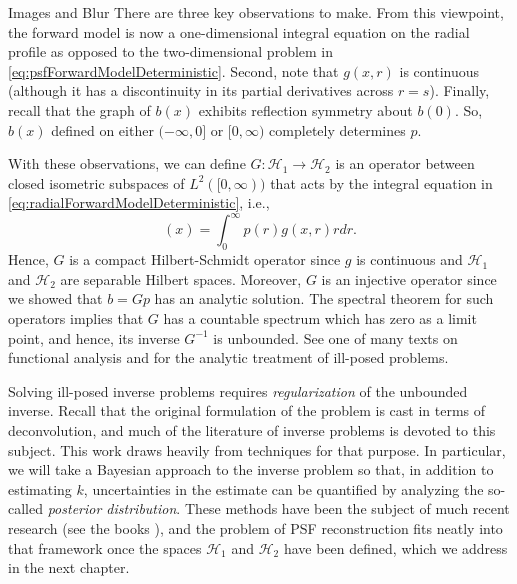 \begin{chapter}{Images and Blur}
  There are three key observations to make.
  From this viewpoint, the forward model is now a one-dimensional integral equation on the radial profile as opposed to the two-dimensional problem in \eqref{eq:psfForwardModelDeterministic}.
  Second, note that $g(x,r)$ is continuous (although it has a discontinuity in its partial derivatives across $r=s$).
  Finally, recall that the graph of $b(x)$ exhibits reflection symmetry about $b(0)$.
  So, $b(x)$ defined on either $(-\infty,0]$ or $[0,\infty)$ completely determines $p$.

  With these observations, we can define $G: \mathcal H_1 \to \mathcal H_2$ is an operator between closed isometric subspaces of $L^2([0,\infty))$ that acts by the integral equation in \eqref{eq:radialForwardModelDeterministic}, i.e., 
  \begin{equation}
    [\G p](x) = \int_0^\infty p(r) g(x,r) r dr.
  \end{equation}
  Hence, $G$ is a compact Hilbert-Schmidt operator since $g$ is continuous and $\mathcal H_1$ and $\mathcal H_2$ are separable Hilbert spaces.
  Moreover, $G$ is an injective operator since we showed that $b = Gp$ has an analytic solution. 
  The spectral theorem for such operators implies that $G$ has a countable spectrum which has zero as a limit point, and hence, its inverse $G^{-1}$ is unbounded. %
  See one of many texts on functional analysis \citep{bachman1966,rudin1991} and \citep{tikhonov1963,vogel2002,morozov1993} for the analytic treatment of ill-posed problems.

  Solving ill-posed inverse problems requires \emph{regularization} of the unbounded inverse.
  Recall that the original formulation of the problem is cast in terms of deconvolution, and much of the literature of inverse problems is devoted to this subject.
  This work draws heavily from techniques for that purpose. 
  In particular, we will take a Bayesian approach to the inverse problem so that, in addition to estimating $k$, uncertainties in the estimate can be quantified by analyzing the so-called \emph{posterior distribution}.
  These methods have been the subject of much recent research (see the books \citep{calvetti2007introduction,kaipo2005,stuart2010}), and the problem of PSF reconstruction fits neatly into that framework once the spaces $\mathcal H_1$ and $\mathcal H_2$ have been defined, which we address in the next chapter.

\end{chapter}
